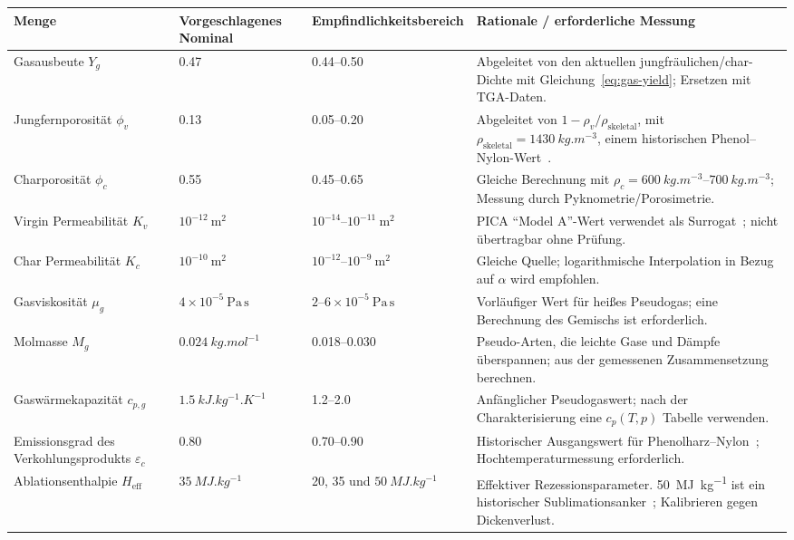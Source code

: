 \documentclass[oneside,openany]{amsdtx}
\begin{document}
\begin{table}[H]
\centering
\scriptsize
\renewcommand{\arraystretch}{1.18}
\begin{tabular}{L{0.18\textwidth}M{0.16\textwidth}M{0.18\textwidth}L{0.38\textwidth}}
\toprule
\textbf{Menge} & \textbf{Vorgeschlagenes Nominal} & \textbf{ Empfindlichkeitsbereich} & \textbf{Rationale / erforderliche Messung} \\
\midrule
Gasausbeute \(Y_g\) & 0.47 & 0.44--0.50 & Abgeleitet von den aktuellen jungfräulichen/char-Dichte mit Gleichung~\eqref{eq:gas-yield}; Ersetzen mit TGA-Daten. \\
Jungfernporosität \(\phi_v\) & 0.13 & 0.05--0.20 & Abgeleitet von \(1-\rho_v/\rho_\mathrm{skeletal}\), mit \(\rho_\mathrm{skeletal}=\SI{1430}{kg.m^{-3}}\), einem historischen Phenol--Nylon-Wert~\cite{clark1972}. \\
Charporosität \(\phi_c\) & 0.55 & 0.45--0.65 & Gleiche Berechnung mit \(\rho_c=\SIrange{600}{700}{kg.m^{-3}}\); Messung durch Pyknometrie/Porosimetrie. \\
Virgin Permeabilität \(K_v\) & \(10^{-12}\ \mathrm{m^2}\) & \(10^{-14}\)--\(10^{-11}\ \mathrm{m^2}\) & PICA ``Model A''-Wert verwendet als Surrogat~\cite{amar2016}; nicht übertragbar ohne Prüfung. \\
Char Permeabilität \(K_c\) & \(10^{-10}\ \mathrm{m^2}\) & \(10^{-12}\)--\(10^{-9}\ \mathrm{m^2}\) & Gleiche Quelle; logarithmische Interpolation in Bezug auf \(\alpha\) wird empfohlen. \\
Gasviskosität \(\mu_g\) & \(4\times10^{-5}\ \mathrm{Pa\,s}\) & \(2\)--\(6\times10^{-5}\ \mathrm{Pa\,s}\) & Vorläufiger Wert für heißes Pseudogas; eine Berechnung des Gemischs ist erforderlich. \\
Molmasse \(M_g\) & \(\SI{0.024}{kg.mol^{-1}}\) & 0.018--0.030 & Pseudo-Arten, die leichte Gase und Dämpfe überspannen; aus der gemessenen Zusammensetzung berechnen. \\
Gaswärmekapazität \(c_{p,g}\) & \(\SI{1.5}{kJ.kg^{-1}.K^{-1}}\) & 1.2--2.0 & Anfänglicher Pseudogaswert; nach der Charakterisierung eine \(c_p(T,p)\) Tabelle verwenden. \\
Emissionsgrad des Verkohlungsprodukts \(\varepsilon_c\) & 0.80 & 0.70--0.90 & Historischer Ausgangswert für Phenolharz--Nylon~\cite{clark1972}; Hochtemperaturmessung erforderlich. \\
Ablationsenthalpie \(H_\mathrm{eff}\) & \(\SI{35}{MJ.kg^{-1}}\) & 20, 35 und \(\SI{50}{MJ.kg^{-1}}\) & Effektiver Rezessionsparameter. \SI{50}{MJ.kg^{-1}} ist ein historischer Sublimationsanker~\cite{clark1972}; Kalibrieren gegen Dickenverlust. \\

\end{tabular}
\end{table}
\end{document}
